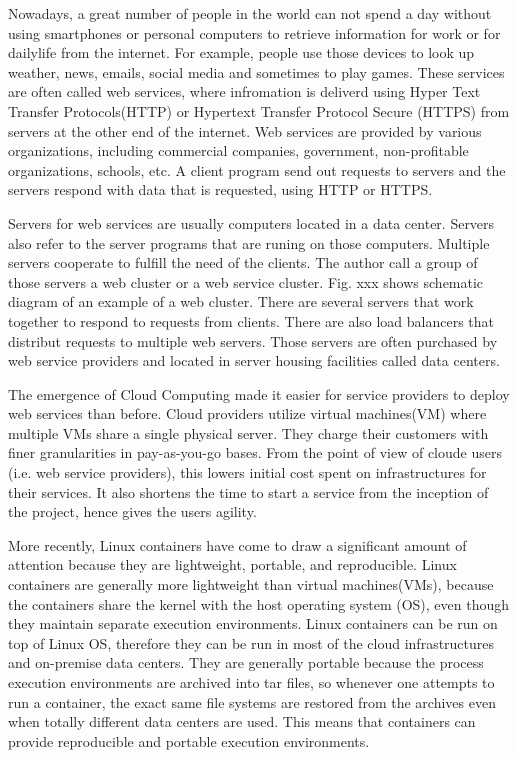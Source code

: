 
Nowadays, a great number of people in the world can not spend a day without using smartphones or personal computers to retrieve information for work or for dailylife from the internet.
For example, people use those devices to look up weather, news, emails, social media and sometimes to play games.
These services are often called web services, where infromation is deliverd using Hyper Text Transfer Protocols(HTTP) or Hypertext Transfer Protocol Secure (HTTPS) from servers at the other end of the internet.
Web services are provided by various organizations, including commercial companies, government, non-profitable organizations, schools, etc.
A client program send out requests to servers and the servers respond with data that is requested, using HTTP or HTTPS. 

Servers for web services are usually computers located in a data center.
Servers also refer to the server programs that are runing on those computers. 
Multiple servers cooperate to fulfill the need of the clients.
The author call a group of those servers a web cluster or a web service cluster.
Fig. xxx shows schematic diagram of an example of a web cluster.
There are several servers that work together to respond to requests from clients.
There are also load balancers that distribut requests to multiple web servers.
Those servers are often purchased by web service providers and located in server housing facilities called data centers.

The emergence of Cloud Computing made it easier for service providers to deploy web services than before.
Cloud providers utilize virtual machines(VM) where multiple VMs share a single physical server.
They charge their customers with finer granularities in pay-as-you-go bases.
From the point of view of cloude users (i.e. web service providers), this lowers initial cost spent on infrastructures for their services.
It also shortens the time to start a service from the inception of the project, hence gives the users agility.


More recently, Linux containers\cite{menage2007adding} have come to draw a significant amount of attention because they are lightweight, portable, and reproducible.
Linux containers are generally more lightweight than virtual machines(VMs), because the containers share the kernel with the host operating system (OS), even though they maintain separate execution environments.
Linux containers can be run on top of Linux OS, therefore they can be run in most of the cloud infrastructures and on-premise data centers. 
They are generally portable because the process execution environments are archived into tar files,
so whenever one attempts to run a container, the exact same file systems are restored from the archives even when totally different data centers are used.
This means that containers can provide reproducible and portable execution environments.

